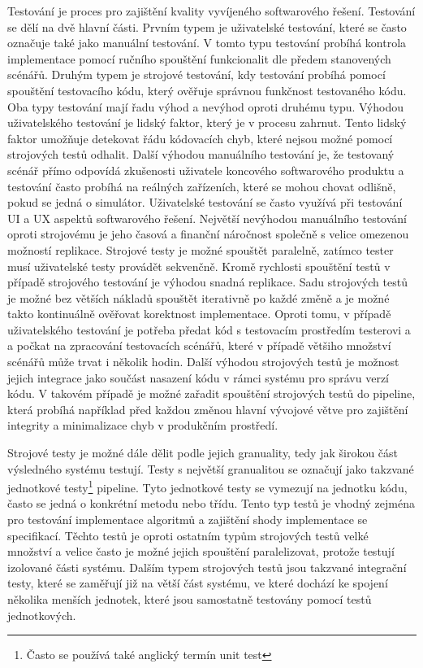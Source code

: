 Testování je proces pro zajištění kvality vyvíjeného softwarového řešení. Testování se dělí na dvě hlavní části. Prvním typem je uživatelské testování, které se často označuje také jako manuální testování. V tomto typu testování probíhá kontrola implementace pomocí ručního spouštění funkcionalit dle předem stanovených scénářů. Druhým typem je strojové testování, kdy testování probíhá pomocí spouštění testovacího kódu, který ověřuje správnou funkčnost testovaného kódu. Oba typy testování mají řadu výhod a nevýhod oproti druhému typu. Výhodou uživatelského testování je lidský faktor, který je v procesu zahrnut. Tento lidský faktor umožňuje detekovat řádu kódovacích chyb, které nejsou možné pomocí strojových testů odhalit. Další výhodou manuálního testování je, že testovaný scénář přímo odpovídá zkušenosti uživatele koncového softwarového produktu a testování často probíhá na reálných zařízeních, které se mohou chovat odlišně, pokud se jedná o simulátor. Uživatelské testování se často využívá při testování UI a UX aspektů softwarového řešení. Největší nevýhodou manuálního testování oproti strojovému je jeho časová a finanční náročnost společně s velice omezenou možností replikace. Strojové testy je možné spouštět paralelně, zatímco tester musí uživatelské testy provádět sekvenčně. Kromě rychlosti spouštění testů v případě strojového testování je výhodou snadná replikace. Sadu strojových testů je možné bez větších nákladů spouštět iterativně po každé změně a je možné takto kontinuálně ověřovat korektnost implementace. Oproti tomu, v případě uživatelského testování je potřeba předat kód s testovacím prostředím testerovi a a počkat na zpracování testovacích scénářů, které v případě většiho množství scénářů může trvat i několik hodin. Další výhodou strojových testů je možnost jejich integrace jako součást nasazení kódu v rámci systému pro správu verzí kódu. V takovém případě je možné zařadit spouštění strojových testů do pipeline, která probíhá například před každou změnou hlavní vývojové větve pro zajištění integrity a minimalizace chyb v produkčním prostředí.

Strojové testy je možné dále dělit podle jejich granuality, tedy jak širokou část výsledného systému testují. Testy s největší granualitou se označují jako takzvané jednotkové testy\footnote{Často se používá také anglický termín unit test} pipeline. Tyto jednotkové testy se vymezují na jednotku kódu, často se jedná o konkrétní metodu nebo třídu. Tento typ testů je vhodný zejména pro testování implementace algoritmů a zajištění shody implementace se specifikací. Těchto testů je oproti ostatním typům strojových testů velké množství a velice často je možné jejich spouštění paralelizovat, protože testují izolované části systému. Dalším typem strojových testů jsou takzvané integrační testy, které se zaměřují již na větší část systému, ve které dochází ke spojení několika menších jednotek, které jsou samostatně testovány pomocí testů jednotkových. 


